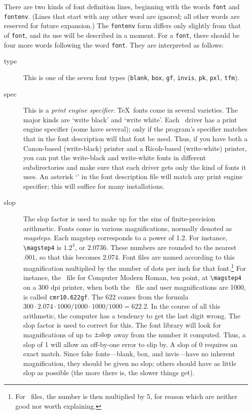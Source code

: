There are two kinds of font definition lines,
beginning with the words {\tt font} and {\tt fontenv}.
(Lines that start with any other word are ignored;
all other words are reserved for future expansion.)
The {\tt fontenv} form differs only slightly from that of {\tt font},
and its use will be described in a moment.
For a {\tt font},
there should be four more words following the word {\tt font}.
They are interpreted as follows:
\begin{description}
\item[type]
This is one of the seven font types
({\tt blank}, {\tt box}, {\tt gf},
{\tt invis}, {\tt pk}, {\tt pxl}, {\tt tfm}).

\item[spec]
This is a {\em print engine specifier}.
\TeX\ fonts come in several varieties.
The major kinds are `write black' and `write white'.
Each \dvi\ driver has a print engine specifier
(some have several);
only if the program's specifier matches that in the font description
will that font be used.
Thus, if you have both a Canon-based (write-black) printer
and a Ricoh-based (write-white) printer,
you can put the write-black and write-white fonts
in different subdirectories
and make sure that each driver
gets only the kind of fonts it uses.
An asterisk `{\tt *}' in the font description file
will match any print engine specifier;
this will suffice for many installations.

\item[slop]
The slop factor is used to make up for
the sins of finite-precision arithmetic.
Fonts come in various magnifications,
normally denoted as {\em magsteps}.
Each magstep corresponds to a power of 1.2.
For instance, \verb|\magstep4| is $1.2^4$, or $2.0736$.
These numbers are rounded to the nearest $.001$,
so that this becomes $2.074$.
Font files are named according to this magnification
multiplied by the number of dots per inch for that font.\footnote
{For \pxl\ files, the number is then multiplied by 5,
for reason which are neither good nor worth explaining.}
For instance, the \gf\ file for Computer Modern Roman, ten point, at
\verb|\magstep4| on a 300 dpi printer,
when both the \dvi\ file and user magnifications are 1000,
is called \verb|cmr10.622gf|.
The $622$ comes from the formula
$300 \cdot 2.074 \cdot 1000/1000 \cdot 1000/1000 = 622.2$.
In the course of all this arithmetic,
the computer has a tendency to get the last digit wrong.
The slop factor is used to correct for this.
The font library will look for magnifications
of up to $\pm\hbox{\rm slop}$ away from the number it computed.
Thus, a slop of 1 will allow an off-by-one error to slip by.
A slop of 0 requires an exact match.
Since fake fonts---blank, box, and invis---have no inherent magnification,
they should be given no slop;
others should have as little slop as possible
(the more there is, the slower things get).


\end{description}
